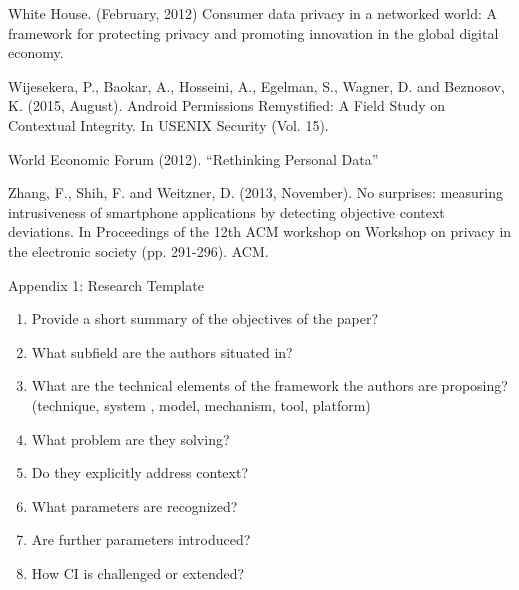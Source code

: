 \documentclass[../thesis.tex]{subfiles}
\newcommand\liststyleWWNumiv{%
\renewcommand\theenumi{\arabic{enumi}}
\renewcommand\theenumii{\alph{enumii}}
\renewcommand\theenumiii{\roman{enumiii}}
\renewcommand\theenumiv{\arabic{enumiv}}
\renewcommand\labelenumi{\theenumi.}
\renewcommand\labelenumii{\theenumii.}
\renewcommand\labelenumiii{\theenumiii.}
\renewcommand\labelenumiv{\theenumiv.}
}
\begin{document}
\bigskip

White House. (February, 2012) Consumer data privacy in a networked
world: A framework for protecting privacy and promoting innovation in
the global digital economy.


\bigskip

Wijesekera, P., Baokar, A., Hosseini, A., Egelman, S., Wagner, D. and
Beznosov, K. (2015, August). Android Permissions Remystified: A Field
Study on Contextual Integrity. In USENIX Security (Vol. 15).


\bigskip

World Economic Forum (2012). ``Rethinking Personal Data''


\bigskip

Zhang, F., Shih, F. and Weitzner, D. (2013, November). No surprises:
measuring intrusiveness of smartphone applications by detecting
objective context deviations. In Proceedings of the 12th ACM workshop
on Workshop on privacy in the electronic society (pp. 291-296). ACM.


\bigskip


\bigskip

Appendix 1: Research Template


\bigskip

\liststyleWWNumiv
\begin{enumerate}
\item \textcolor[rgb]{0.2,0.2,0.2}{Provide a short summary of the
objectives of the paper?}
\item \textcolor[rgb]{0.2,0.2,0.2}{What subfield are the authors
situated in?}
\item \textcolor[rgb]{0.2,0.2,0.2}{What are the technical elements of
the framework the authors are proposing? (technique, system , model,
mechanism, tool, platform)}
\item \textcolor[rgb]{0.2,0.2,0.2}{What problem are they solving?}
\item \textcolor[rgb]{0.2,0.2,0.2}{Do they explicitly address context?}
\item \textcolor[rgb]{0.2,0.2,0.2}{What parameters are recognized?}
\item \textcolor[rgb]{0.2,0.2,0.2}{Are further parameters introduced?}
\item \textcolor[rgb]{0.2,0.2,0.2}{How CI is challenged or extended?}
\end{enumerate}

\bigskip

 
\end{document}
